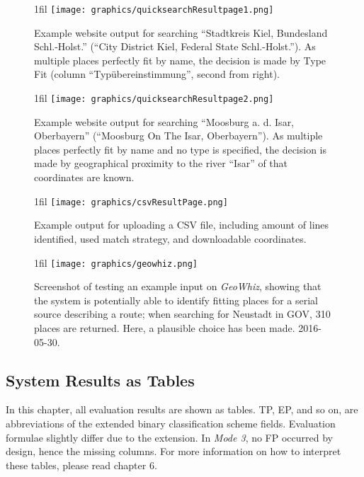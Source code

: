 \documentclass[11pt]{article}
\makeatletter
\newcommand*{\centerfloat}{
  \parindent \z@
  \leftskip \z@ \@plus 1fil \@minus \textwidth
  \rightskip\leftskip
  \parfillskip \z@skip}
\makeatother
\begin{document}
\begin{figure}[h!]
  \centerfloat
    \texttt{[image: graphics/quicksearchResultpage1.png]}
  \caption{Example website output for searching ``Stadtkreis Kiel, Bundesland Schl.-Holst.'' (``City District Kiel, Federal State Schl.-Holst.''). As multiple places perfectly fit by name, the decision is made by Type Fit (column ``Typübereinstimmung'', second from right).}
  \label{fig:quicksearchResultpage1}
\end{figure} \newpage

\begin{figure}[h!]
  \centerfloat
    \texttt{[image: graphics/quicksearchResultpage2.png]}
  \caption{Example website output for searching ``Moosburg a. d. Isar, Oberbayern'' (``Moosburg On The Isar, Oberbayern''). As multiple places perfectly fit by name and no type is specified, the decision is made by geographical proximity to the river ``Isar'' of that coordinates are known.}
  \label{fig:quicksearchResultpage2}
\end{figure} \newpage

\begin{figure}[h!]
  \centerfloat
    \texttt{[image: graphics/csvResultPage.png]}
  \caption{Example output for uploading a CSV file, including amount of lines identified, used match strategy, and downloadable coordinates.}
  \label{fig:csvResultPage}
\end{figure} \newpage

\begin{figure}[h!]
  \centerfloat
    \texttt{[image: graphics/geowhiz.png]}
  \caption{Screenshot of testing an example input on \emph{GeoWhiz}, showing that the system is potentially able to identify fitting places for a serial source describing a route; when searching for Neustadt in GOV, 310 places are returned. Here, a plausible choice has been made. 2016-05-30.}
  \label{fig:geowhiz}
\end{figure} \newpage

\newpage
\subsection{System Results as Tables}

In this chapter, all evaluation results are shown as tables. TP, EP, and so on, are abbreviations of the extended binary classification scheme fields. Evaluation formulae slightly differ due to the extension. In \emph{Mode 3}, no FP occurred by design, hence the missing columns. For more information on how to interpret these tables, please read chapter 6.
\end{document}
